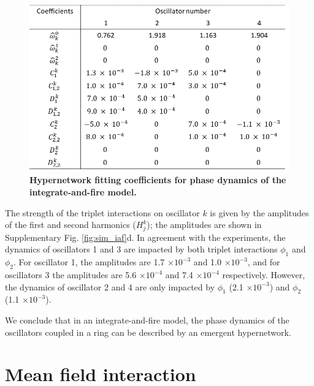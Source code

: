 \documentclass[12pt]{article}
\theoremstyle{plain}
\theoremstyle{definition}
\theoremstyle{remark}
\theoremstyle{remark}
\begin{document}
{\begin{figure}[!ht]
    \centering
    \includegraphics[width=0.6\columnwidth]{Slide4_v1.png}
    \caption{{\bf Hypernetwork fitting coefficients for phase dynamics of the integrate-and-fire model. }  }
    \label{fig:coeff_tab}
\end{figure}


The strength of the triplet interactions on oscillator $k$ is given by the amplitudes of the first and second harmonics
($H_j^k$); the amplitudes are shown in Supplementary Fig. \ref{fig:sim_iaf}d. In agreement with the experiments, the dynamics of oscillators 1 and 3 are impacted by both triplet interactions $\phi_1$ and $\phi_2$. For oscillator 1, the amplitudes are 1.7 $\times 10^{-3}$ and 1.0 $\times 10^{-3}$, and for oscillators 3 the amplitudes are
5.6 $\times 10^{-4}$ and 7.4 $\times 10^{-4}$ respectively. However, the dynamics of oscillator 2 and 4 are only impacted by $\phi_1$ (2.1 $\times 10^{-3}$) and $\phi_2$ (1.1 $\times 10^{-3}$). 

We conclude that in an integrate-and-fire model, the phase dynamics of the oscillators coupled in a ring can be described by an emergent hypernetwork.





\section{Mean field interaction}




}
\end{document}
